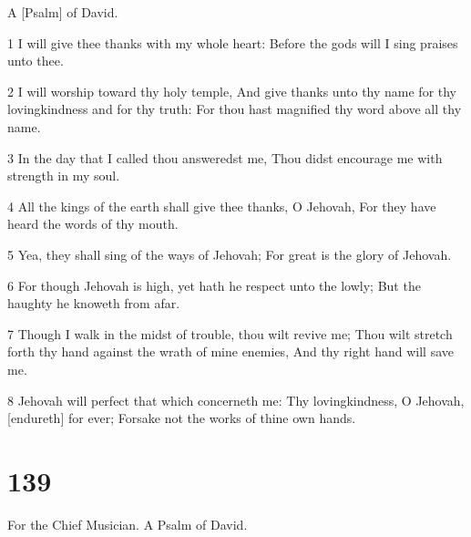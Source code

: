\par A [Psalm] of David.

\par 1 I will give thee thanks with my whole heart: Before the gods will I sing praises unto thee.
\par 2 I will worship toward thy holy temple, And give thanks unto thy name for thy lovingkindness and for thy truth: For thou hast magnified thy word above all thy name.
\par 3 In the day that I called thou answeredst me, Thou didst encourage me with strength in my soul.
\par 4 All the kings of the earth shall give thee thanks, O Jehovah, For they have heard the words of thy mouth.
\par 5 Yea, they shall sing of the ways of Jehovah; For great is the glory of Jehovah.
\par 6 For though Jehovah is high, yet hath he respect unto the lowly; But the haughty he knoweth from afar.
\par 7 Though I walk in the midst of trouble, thou wilt revive me; Thou wilt stretch forth thy hand against the wrath of mine enemies, And thy right hand will save me.
\par 8 Jehovah will perfect that which concerneth me: Thy lovingkindness, O Jehovah, [endureth] for ever; Forsake not the works of thine own hands.

\chapter{139}

\par For the Chief Musician. A Psalm of David.

